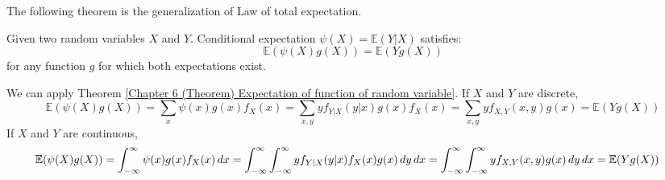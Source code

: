 \documentclass{huhtakm-template-book}
\newcommand{\expect}{\mathbb{E}}
\begin{document}
The following theorem is the generalization of Law of total expectation.
\begin{thm}
	\label{Chapter 6 (Theorem) Generalization of Law of Total Expectation}
	Given two random variables $X$ and $Y$. Conditional expectation $\psi(X)=\expect(Y|X)$ satisfies:
	\begin{equation*}
		\expect(\psi(X)g(X))=\expect(Yg(X))
	\end{equation*}
	for any function $g$ for which both expectations exist.
\end{thm}
\begin{proofing}
	We can apply Theorem \ref{Chapter 6 (Theorem) Expectation of function of random variable}. If $X$ and $Y$ are discrete,
	\begin{equation*}
		\expect(\psi(X)g(X))=\sum_{x}\psi(x)g(x)f_{X}(x)=\sum_{x,y}yf_{Y|X}(y|x)g(x)f_{X}(x)=\sum_{x,y}yf_{X,Y}(x,y)g(x)=\expect(Yg(X))
	\end{equation*}
	If $X$ and $Y$ are continuous,
	\begin{align*}
		\expect(\psi(X)g(X))&=\intinfty\psi(x)g(x)f_{X}(x)\,dx=\intinfty\intinfty yf_{Y|X}(y|x)f_{X}(x)g(x)\,dy\,dx=\intinfty\intinfty yf_{X,Y}(x,y)g(x)\,dy\,dx=\expect(Yg(X))
	\end{align*}
\end{proofing}
\end{document}
